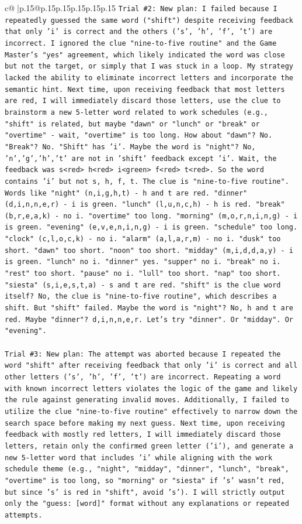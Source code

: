 \documentclass{article}
\begin{document}
{\begin{supertabular}{c@{$\;$}|p{.15\linewidth}@{}p{.15\linewidth}p{.15\linewidth}p{.15\linewidth}p{.15\linewidth}p{.15\linewidth}}
{{{\texttt{Trial \#2: New plan: I failed because I repeatedly guessed the same word ("shift") despite receiving feedback that only 'i' is correct and the others ('s', 'h', 'f', 't') are incorrect. I ignored the clue "nine{-}to{-}five routine" and the Game Master's "yes" agreement, which likely indicated the word was close but not the target, or simply that I was stuck in a loop. My strategy lacked the ability to eliminate incorrect letters and incorporate the semantic hint. Next time, upon receiving feedback that most letters are red, I will immediately discard those letters, use the clue to brainstorm a new 5{-}letter word related to work schedules (e.g., "shift" is related, but maybe "dawn" or "lunch" or "break" or "overtime" {-} wait, "overtime" is too long. How about "dawn"? No. "Break"? No. "Shift" has 'i'. Maybe the word is "night"? No, 'n','g','h','t' are not in 'shift' feedback except 'i'. Wait, the feedback was s<red> h<red> i<green> f<red> t<red>. So the word contains 'i' but not s, h, f, t. The clue is "nine{-}to{-}five routine". Words like "night" (n,i,g,h,t) {-} h and t are red. "dinner" (d,i,n,n,e,r) {-} i is green. "lunch" (l,u,n,c,h) {-} h is red. "break" (b,r,e,a,k) {-} no i. "overtime" too long. "morning" (m,o,r,n,i,n,g) {-} i is green. "evening" (e,v,e,n,i,n,g) {-} i is green. "schedule" too long. "clock" (c,l,o,c,k) {-} no i. "alarm" (a,l,a,r,m) {-} no i. "dusk" too short. "dawn" too short. "noon" too short. "midday" (m,i,d,d,a,y) {-} i is green. "lunch" no i. "dinner" yes. "supper" no i. "break" no i. "rest" too short. "pause" no i. "lull" too short. "nap" too short. "siesta" (s,i,e,s,t,a) {-} s and t are red. "shift" is the clue word itself? No, the clue is "nine{-}to{-}five routine", which describes a shift. But "shift" failed. Maybe the word is "night"? No, h and t are red. Maybe "dinner"? d,i,n,n,e,r. Let's try "dinner". Or "midday". Or "evening".} \\
\\ 
\texttt{Trial \#3: New plan: The attempt was aborted because I repeated the word "shift" after receiving feedback that only 'i' is correct and all other letters ('s', 'h', 'f', 't') are incorrect. Repeating a word with known incorrect letters violates the logic of the game and likely the rule against generating invalid moves. Additionally, I failed to utilize the clue "nine{-}to{-}five routine" effectively to narrow down the search space before making my next guess. Next time, upon receiving feedback with mostly red letters, I will immediately discard those letters, retain only the confirmed green letter ('i'), and generate a new 5{-}letter word that includes 'i' while aligning with the work schedule theme (e.g., "night", "midday", "dinner", "lunch", "break", "overtime" is too long, so "morning" or "siesta" if 's' wasn't red, but since 's' is red in "shift", avoid 's'). I will strictly output only the "guess: {[}word{]}" format without any explanations or repeated attempts.} \\
}}}
\end{supertabular}}
\end{document}
